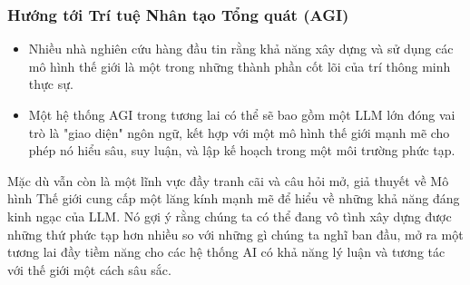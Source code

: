 \subsubsection{Hướng tới Trí tuệ Nhân tạo Tổng quát (AGI)}
\begin{itemize}
    \item Nhiều nhà nghiên cứu hàng đầu tin rằng khả năng xây dựng và sử dụng các mô hình thế giới là một trong những thành phần cốt lõi của trí thông minh thực sự.
    \item Một hệ thống AGI trong tương lai có thể sẽ bao gồm một LLM lớn đóng vai trò là "giao diện" ngôn ngữ, kết hợp với một mô hình thế giới mạnh mẽ cho phép nó hiểu sâu, suy luận, và lập kế hoạch trong một môi trường phức tạp.
\end{itemize}

Mặc dù vẫn còn là một lĩnh vực đầy tranh cãi và câu hỏi mở, giả thuyết về Mô hình Thế giới cung cấp một lăng kính mạnh mẽ để hiểu về những khả năng đáng kinh ngạc của LLM. Nó gợi ý rằng chúng ta có thể đang vô tình xây dựng được những thứ phức tạp hơn nhiều so với những gì chúng ta nghĩ ban đầu, mở ra một tương lai đầy tiềm năng cho các hệ thống AI có khả năng lý luận và tương tác với thế giới một cách sâu sắc.